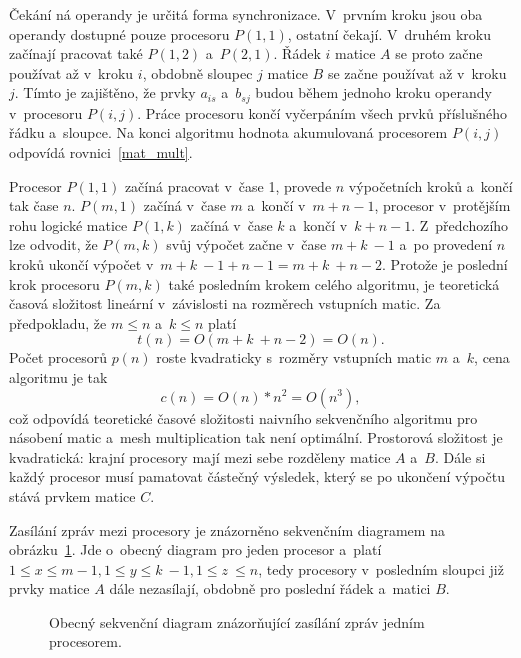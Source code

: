 \documentclass[a4paper, 12pt]{article}[24.4.2015]
\begin{document}
Čekání ná operandy je určitá forma synchronizace. V~prvním kroku jsou oba operandy dostupné pouze procesoru \(P(1,1)\), ostatní čekají. V~druhém kroku začínají pracovat také \(P(1,2)\) a~\(P(2,1)\). Řádek \(i\) matice \(A\) se proto začne používat až v~kroku \(i\), obdobně sloupec \(j\) matice \(B\) se začne používat až v~kroku \(j\). Tímto je zajištěno, že prvky \(a_{is}\) a~\(b_{sj}\) budou během jednoho kroku operandy v~procesoru \(P(i,j)\). Práce procesoru končí vyčerpáním všech prvků příslušného řádku a~sloupce. Na konci algoritmu hodnota akumulovaná procesorem \(P(i,j)\) odpovídá rovnici~\ref{mat_mult}.

Procesor \(P(1,1)\) začíná pracovat v~čase 1, provede \(n\) výpočetních kroků a~končí tak čase \(n\). \(P(m, 1)\) začíná v~čase \(m\) a~končí v~\(m + n - 1\), procesor v~protějším rohu logické matice \(P(1, k)\) začíná v~čase \(k\) a~končí v~\(k + n - 1\). Z~předchozího lze odvodit, že \(P(m, k)\) svůj výpočet začne v~čase \(m + k~- 1\) a~po provedení \(n\) kroků ukončí výpočet v~\(m + k~- 1 + n - 1 = m + k~+ n - 2\). Protože je poslední krok procesoru \(P(m, k)\) také posledním krokem celého algoritmu, je teoretická časová složitost lineární v~závislosti na rozměrech vstupních matic. Za předpokladu, že \(m \leq n\) a~\(k \leq n\) platí
\[
t(n) = O(m + k~+ n - 2) = O(n).
\]
Počet procesorů \(p(n)\) roste kvadraticky s~rozměry vstupních matic \(m\) a~\(k\), cena algoritmu je tak
\[
c(n) = O(n) * n^2 = O(n^3),
\]
což odpovídá teoretické časové složitosti naivního sekvenčního algoritmu pro násobení matic a~mesh multiplication tak není optimální. Prostorová složitost je kvadratická: krajní procesory mají mezi sebe rozděleny matice \(A\) a~\(B\). Dále si každý procesor musí pamatovat částečný výsledek, který se po ukončení výpočtu stává prvkem matice \(C\).

Zasílání zpráv mezi procesory je znázorněno sekvenčním diagramem na obrázku~\ref{fig:sequence}. Jde o~obecný diagram pro jeden procesor a~platí \(1 \leq x \leq m - 1, 1 \leq y \leq k~- 1, 1 \leq z~\leq n\), tedy procesory v~posledním sloupci již prvky matice \(A\) dále nezasílají, obdobně pro poslední řádek a~matici \(B\).
\begin{figure}
\centering
\resizebox{0.7\textwidth}{!}{}
\caption{Obecný sekvenční diagram znázorňující zasílání zpráv jedním procesorem.}
\label{fig:sequence}
\end{figure}

\end{document}
